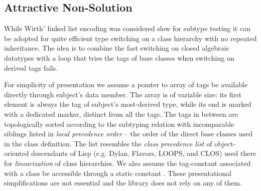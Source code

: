 \subsection{Attractive Non-Solution}
\label{sec:cotc}



While Wirth' linked list encoding was considered slow for subtype testing it can 
be adopted for quite efficient type switching on a class hierarchy with no 
repeated inheritance. The idea is to combine the fast switching on closed 
algebraic datatypes with a loop that tries the tags of base classes when 
switching on derived tags fails.


For simplicity of presentation we assume a pointer to array of tags be available 
directly through subject's  data member. The array is of 
variable size: its first element is always the tag of subject's most-derived 
type, while its end is marked with a dedicated  marker, 
distinct from all the tags. The tags in between are topologically sorted 
according to the subtyping relation with incomparable siblings listed in 
\emph{local precedence order} -- the order of the direct base classes used in 
the class definition. The list resembles the \emph{class precedence list} of 
object-oriented descendants of Lisp (e.g. Dylan, Flavors, LOOPS, and CLOS) used 
there for \emph{linearization} of class hierarchies. 
We also assume the tag-constant associated with a class  be accessible 
through a static constant . These presentational 
simplifications are not essential and the library does not rely on any of them. 

